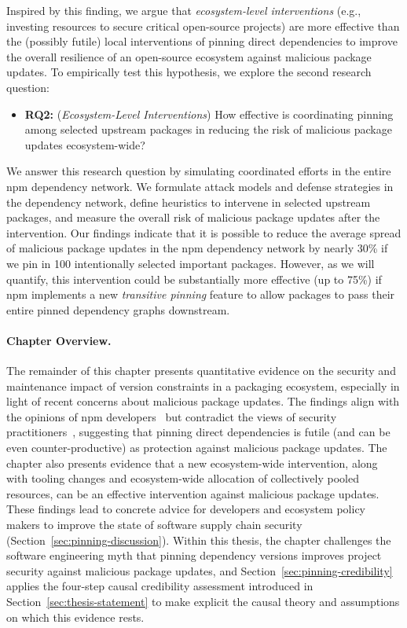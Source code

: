 Inspired by this finding, we argue that \textit{ecosystem-level interventions} (e.g., investing resources to secure critical open-source projects) are more effective than the (possibly futile) local interventions of pinning direct dependencies to improve the overall resilience of an open-source ecosystem against malicious package updates.
To empirically test this hypothesis, we explore the second research question:
\begin{itemize}[leftmargin=20pt]
    \item \textbf{RQ2:} (\emph{Ecosystem-Level Interventions}) How effective is coordinating pinning among selected upstream packages in reducing the risk of malicious package updates ecosystem-wide? 
\end{itemize}
We answer this research question by simulating coordinated efforts in the entire npm dependency network.
We formulate attack models and defense strategies in the dependency network, define heuristics to intervene in selected upstream packages, and measure the overall risk of malicious package updates after the intervention.
Our findings indicate that it is possible to reduce the average spread of malicious package updates in the npm dependency network by nearly 30\% if we pin in 100 intentionally selected important packages.
However, as we will quantify, this intervention could be substantially more effective (up to 75\%) if npm implements a new \textit{transitive pinning} feature to allow packages to pass their entire pinned dependency graphs downstream.

\paragraph{Chapter Overview.} The remainder of this chapter presents quantitative evidence on the security and maintenance impact of version constraints in a packaging ecosystem, especially in light of recent concerns about malicious package updates.
The findings align with the opinions of npm developers~\cite{DBLP:journals/tse/JafariCAST22} but contradict the views of security practitioners~\cite{DBLP:conf/sp/LadisaPMB23, DBLP:journals/ieeesp/ZahanKHSW23}, suggesting that pinning direct dependencies is futile (and can be even counter-productive) as protection against malicious package updates.
The chapter also presents evidence that a new ecosystem-wide intervention, along with tooling changes and ecosystem-wide allocation of collectively pooled resources, can be an effective intervention against malicious package updates.
These findings lead to concrete advice for developers and ecosystem policy makers to improve the state of software supply chain security (Section~\ref{sec:pinning-discussion}).
Within this thesis, the chapter challenges the software engineering myth that pinning dependency versions improves project security against malicious package updates, and Section~\ref{sec:pinning-credibility} applies the four-step causal credibility assessment introduced in Section~\ref{sec:thesis-statement} to make explicit the causal theory and assumptions on which this evidence rests.

